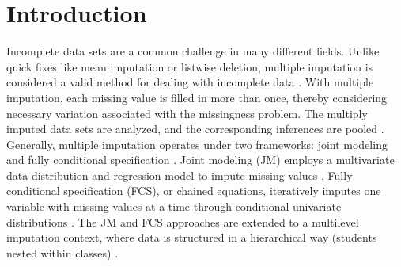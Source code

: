 \documentclass[10pt, a4paper, titlepage]{article}
\begin{document}
\section{Introduction} 
Incomplete data sets are a common challenge in many different fields. Unlike quick fixes like mean imputation or listwise deletion, multiple imputation is considered a valid method for dealing with incomplete data \cite{mistlerComparisonJointModel2017, buurenFlexibleImputationMissing2018}. With multiple imputation, each missing value is filled in more than once, thereby considering necessary variation associated with the missingness problem. The multiply imputed data sets are analyzed, and the corresponding inferences are pooled \cite{buurenFlexibleImputationMissing2018, austin2021}. Generally, multiple imputation operates under two frameworks: joint modeling and fully conditional specification \cite{mistlerComparisonJointModel2017, buurenFlexibleImputationMissing2018}. Joint modeling (JM) employs a multivariate data distribution and regression model to impute missing values \cite{buurenFlexibleImputationMissing2018, enders2018}. Fully conditional specification (FCS), or chained equations, iteratively imputes one variable with missing values at a time through conditional univariate distributions \cite{enders2018, buurenFlexibleImputationMissing2018}. The JM and FCS approaches are extended to a multilevel imputation context, where data is structured in a hierarchical way (students nested within classes) \cite{mistlerComparisonJointModel2017}. 
\end{document}
